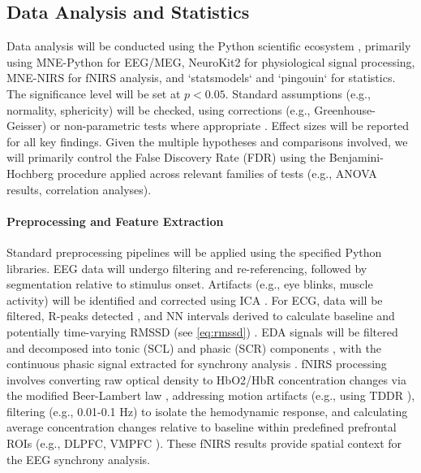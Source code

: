 \documentclass[12pt]{article} %
\begin{document}
\subsection{Data Analysis and Statistics}
Data analysis will be conducted using the Python scientific ecosystem \parencite{harrisArrayProgrammingNumPy2020, virtanenSciPy10Fundamental2020}, primarily using MNE-Python \parencite{gramfortMEGEEGData2013} for EEG/MEG, NeuroKit2 \parencite{makowskiNeuroKit2PythonToolbox2021} for physiological signal processing, MNE-NIRS \parencite{yucelBestPracticesFNIRS2021} for fNIRS analysis, and `statsmodels` \parencite{seaboldStatsmodelsEconometricStatistical2010} and `pingouin` \parencite{vallatPingouinStatisticsPython2018} for statistics. The significance level will be set at $p < 0.05$. Standard assumptions (e.g., normality, sphericity) will be checked, using corrections (e.g., Greenhouse-Geisser) or non-parametric tests where appropriate \parencite{fieldDiscoveringStatisticsUsing2024}. Effect sizes will be reported for all key findings. Given the multiple hypotheses and comparisons involved, we will primarily control the False Discovery Rate (FDR) using the Benjamini-Hochberg procedure \parencite{benjaminiControllingFalseDiscovery1995} applied across relevant families of tests (e.g., ANOVA results, correlation analyses).

\paragraph{Preprocessing and Feature Extraction}
Standard preprocessing pipelines will be applied using the specified Python libraries. \gls{EEG} data will undergo filtering and re-referencing, followed by segmentation relative to stimulus onset. Artifacts (e.g., eye blinks, muscle activity) will be identified and corrected using \gls{ICA} \parencite{delormeEEGLABOpenSource2004}. For \gls{ECG}, data will be filtered, R-peaks detected \parencite{panRealTimeQRSDetection1985}, and \gls{NN intervals} derived to calculate baseline and potentially time-varying \gls{RMSSD} (see \autoref{eq:rmssd}) \parencite{malikHeartRateVariability1996}. \gls{EDA} signals will be filtered and decomposed into tonic (\gls{SCL}) and phasic (\gls{SCR}) components \parencite{benedekDecompositionSkinConductance2010}, with the continuous phasic signal extracted for synchrony analysis \parencite{boucseinElectrodermalActivity2012}. \gls{fNIRS} processing involves converting raw optical density to \gls{HbO2}/\gls{HbR} concentration changes via the modified Beer-Lambert law \parencite{copeSystemLongtermMeasurement1988}, addressing motion artifacts (e.g., using \gls{TDDR} \parencite{scholkmannReviewContinuousWave2014}), filtering (e.g., 0.01-0.1 Hz) to isolate the hemodynamic response, and calculating average concentration changes relative to baseline within predefined prefrontal \gls{ROI}s (e.g., \gls{DLPFC}, \gls{VMPFC} \parencite{etkinEmotionalProcessingAnterior2011, motzkinVentromedialPrefrontalCortex2015}). These \gls{fNIRS} results provide spatial context for the \gls{EEG} synchrony analysis.
\end{document}
